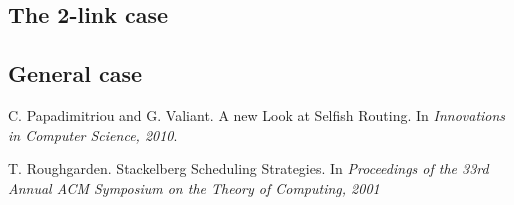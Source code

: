 \subsection{The 2-link case}


\subsection{General case}




\begin{thebibliography}{8}

  C. Papadimitriou and G. Valiant. A new Look at Selfish Routing. In
  \emph{Innovations in Computer Science, 2010}.

	T. Roughgarden. Stackelberg Scheduling Strategies. In \emph{Proceedings of the 33rd Annual ACM Symposium on the Theory of Computing, 2001}

\end{thebibliography}

